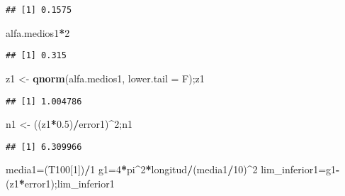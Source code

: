 \documentclass[
]{article}
\newenvironment{Shaded}{\begin{snugshade}}{\end{snugshade}}
\newcommand{\AttributeTok}[1]{\textcolor[rgb]{0.13,0.29,0.53}{#1}}
\newcommand{\DecValTok}[1]{\textcolor[rgb]{0.00,0.00,0.81}{#1}}
\newcommand{\FloatTok}[1]{\textcolor[rgb]{0.00,0.00,0.81}{#1}}
\newcommand{\FunctionTok}[1]{\textcolor[rgb]{0.13,0.29,0.53}{\textbf{#1}}}
\newcommand{\NormalTok}[1]{#1}
\newcommand{\OtherTok}[1]{\textcolor[rgb]{0.56,0.35,0.01}{#1}}
\newcommand{\SpecialCharTok}[1]{\textcolor[rgb]{0.81,0.36,0.00}{\textbf{#1}}}
\begin{document}
\begin{verbatim}
## [1] 0.1575
\end{verbatim}

\begin{Shaded}
\begin{Highlighting}[]
\NormalTok{alfa.medios1}\SpecialCharTok{*}\DecValTok{2}
\end{Highlighting}
\end{Shaded}

\begin{verbatim}
## [1] 0.315
\end{verbatim}

\begin{Shaded}
\begin{Highlighting}[]
\NormalTok{z1 }\OtherTok{\textless{}{-}} \FunctionTok{qnorm}\NormalTok{(alfa.medios1, }\AttributeTok{lower.tail =}\NormalTok{ F);z1}
\end{Highlighting}
\end{Shaded}

\begin{verbatim}
## [1] 1.004786
\end{verbatim}

\begin{Shaded}
\begin{Highlighting}[]
\NormalTok{n1 }\OtherTok{\textless{}{-}}\NormalTok{ ((z1}\SpecialCharTok{*}\FloatTok{0.5}\NormalTok{)}\SpecialCharTok{/}\NormalTok{error1)}\SpecialCharTok{\^{}}\DecValTok{2}\NormalTok{;n1}
\end{Highlighting}
\end{Shaded}

\begin{verbatim}
## [1] 6.309966
\end{verbatim}

\begin{Shaded}
\begin{Highlighting}[]
\NormalTok{media1}\OtherTok{=}\NormalTok{(T100[}\DecValTok{1}\NormalTok{])}\SpecialCharTok{/}\DecValTok{1}
\NormalTok{g1}\OtherTok{=}\DecValTok{4}\SpecialCharTok{*}\NormalTok{pi}\SpecialCharTok{\^{}}\DecValTok{2}\SpecialCharTok{*}\NormalTok{longitud}\SpecialCharTok{/}\NormalTok{(media1}\SpecialCharTok{/}\DecValTok{10}\NormalTok{)}\SpecialCharTok{\^{}}\DecValTok{2}
\NormalTok{lim\_inferior1}\OtherTok{=}\NormalTok{g1}\SpecialCharTok{{-}}\NormalTok{(z1}\SpecialCharTok{*}\NormalTok{error1);lim\_inferior1}
\end{Highlighting}
\end{Shaded}
\end{document}
